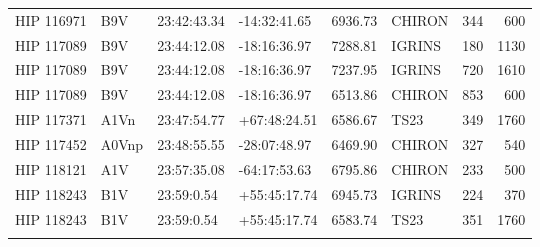 \documentclass{emulateapj}
\begin{document}
\begin{longtable*}{|l|lllrlrr|}
  HIP 116971 &            B9V &    23:42:43.34 &   -14:32:41.65 &  6936.73 &     CHIRON &      344 &     600 \\
  HIP 117089 &            B9V &    23:44:12.08 &   -18:16:36.97 &  7288.81 &     IGRINS &      180 &    1130 \\
  HIP 117089 &            B9V &    23:44:12.08 &   -18:16:36.97 &  7237.95 &     IGRINS &      720 &    1610 \\
  HIP 117089 &            B9V &    23:44:12.08 &   -18:16:36.97 &  6513.86 &     CHIRON &      853 &     600 \\
  HIP 117371 &           A1Vn &    23:47:54.77 &   +67:48:24.51 &  6586.67 &       TS23 &      349 &    1760 \\
  HIP 117452 &          A0Vnp &    23:48:55.55 &   -28:07:48.97 &  6469.90 &     CHIRON &      327 &     540 \\
  HIP 118121 &            A1V &    23:57:35.08 &   -64:17:53.63 &  6795.86 &     CHIRON &      233 &     500 \\
  HIP 118243 &            B1V &     23:59:0.54 &   +55:45:17.74 &  6945.73 &     IGRINS &      224 &     370 \\
  HIP 118243 &            B1V &     23:59:0.54 &   +55:45:17.74 &  6583.74 &       TS23 &      351 &    1760 \\
\label{tab:observations}
\end{longtable*}
\end{document}
